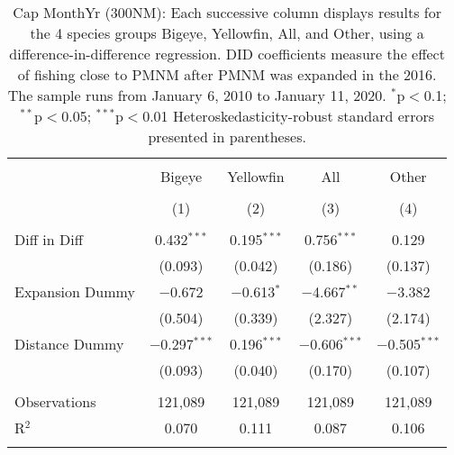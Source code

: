 
\begin{table}[!htbp] \centering 
  \caption{Cap MonthYr (300NM): Each successive column displays results for the 4 species groups Bigeye, Yellowfin, All, and Other, using a difference-in-difference regression. DID coefficients measure the effect of fishing close to PMNM after PMNM was expanded in the 2016. The sample runs from January 6, 2010 to January 11, 2020. $^{*}$p$<$0.1; $^{**}$p$<$0.05; $^{***}$p$<$0.01 Heteroskedasticity-robust standard errors presented in parentheses.} 
  \label{tbl:timeFE300NM} 
\begin{tabular}{@{\extracolsep{5pt}}lcccc} 
\\[-1.8ex]\hline 
\hline \\[-1.8ex] 
 & Bigeye & Yellowfin & All & Other \\ 
\\[-1.8ex] & (1) & (2) & (3) & (4)\\ 
\hline \\[-1.8ex] 
 Diff in Diff & 0.432$^{***}$ & 0.195$^{***}$ & 0.756$^{***}$ & 0.129 \\ 
  & (0.093) & (0.042) & (0.186) & (0.137) \\ 
  Expansion Dummy & $-$0.672 & $-$0.613$^{*}$ & $-$4.667$^{**}$ & $-$3.382 \\ 
  & (0.504) & (0.339) & (2.327) & (2.174) \\ 
  Distance Dummy & $-$0.297$^{***}$ & 0.196$^{***}$ & $-$0.606$^{***}$ & $-$0.505$^{***}$ \\ 
  & (0.093) & (0.040) & (0.170) & (0.107) \\ 
 \hline \\[-1.8ex] 
Observations & 121,089 & 121,089 & 121,089 & 121,089 \\ 
R$^{2}$ & 0.070 & 0.111 & 0.087 & 0.106 \\ 
\hline 
\hline \\[-1.8ex] 
\end{tabular} 
\end{table} 
